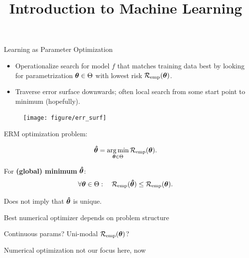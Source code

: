 \documentclass[11pt,compress,t,notes=noshow, xcolor=table]{beamer}
\title{Introduction to Machine Learning}
\begin{document}


\begin{vbframe}{Learning as Parameter Optimization}
\begin{itemize}
\item Operationalize search for model $f$ that matches
    training data best by looking for parametrization $\bm{\theta} \in \Theta$
    with lowest risk $\mathcal{R}_{\text{emp}}(\bm{\theta})$.
\item Traverse error surface downwards; often local search from some start point to minimum (hopefully).
\end{itemize}

\vfill

\begin{center}
\begin{figure}[!b]
\texttt{[image: figure/err\_surf]}
\end{figure}
\end{center}

\framebreak

ERM optimization problem:

\[
\bm{\hat\theta}  = \mathop{\mathrm{arg\,min}}_{\bm{\theta} \in \Theta} \mathcal{R}_{\text{emp}}(\bm{\theta}) .
\]

For \textbf{(global) minimum} $\bm{\hat\theta}$:
\[
\forall \bm{\theta} \in \Theta :\quad \mathcal{R}_{\text{emp}}(\bm{\hat\theta}) \leq \mathcal{R}_{\text{emp}}(\bm{\theta}) .
\]

Does not imply that $\bm{\hat\theta}$ is unique. \\
\lz

\begin{itemizeM}
\item Best numerical optimizer depends on problem structure
\item Continuous params? Uni-modal $\mathcal{R}_{\text{emp}}(\bm{\theta})$? 
\item Numerical optimization not our focus here, now
\end{itemizeM}

\end{vbframe}
\end{document}
